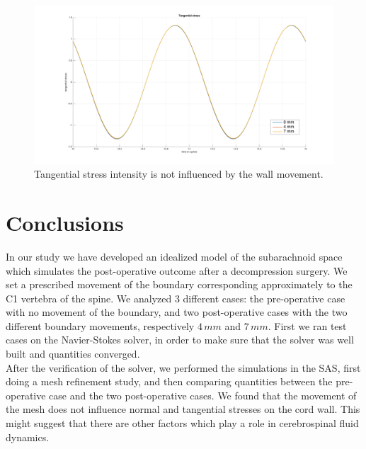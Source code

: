 \documentclass[a4paper,11pt,oneside]{book}
\begin{document}
\begin{figure}[h!]
\centering
\includegraphics[width=\textwidth]{images/tangential_stress.png}
\caption{Tangential stress intensity is not influenced by the wall movement.}
\end{figure}




\chapter{Conclusions}

In our study we have developed an idealized model of the subarachnoid space which simulates the post-operative outcome after a decompression surgery. We set a prescribed movement of the boundary corresponding approximately to the C1 vertebra of the spine. We analyzed 3 different cases: the pre-operative case with no movement of the boundary, and two post-operative cases with the two different boundary movements, respectively $4 \, mm$ and $7 \, mm$.
First we ran test cases on the Navier-Stokes solver, in order to make sure that the solver was well built and quantities converged. \\

After the verification of the solver, we performed the simulations in the SAS, first doing a mesh refinement study, and then comparing quantities between the pre-operative case and the two post-operative cases. We found that the movement of the mesh does not influence normal and tangential stresses on the cord wall. This might suggest that there are other factors which play a role in cerebrospinal fluid dynamics. \\
\end{document}

